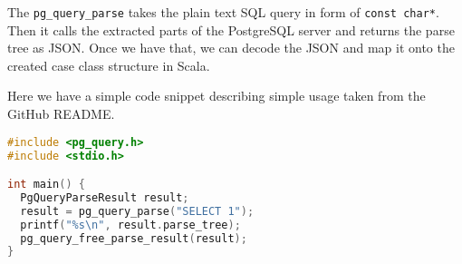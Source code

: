The \texttt{pg\_query\_parse} takes the plain text SQL query in form of \texttt{const char*}. Then it calls the extracted parts of the PostgreSQL server and returns the parse tree as JSON. Once we have that, we can decode the JSON and map it onto the created case class structure in Scala.

\newpage
Here we have a simple code snippet describing simple usage taken from the GitHub README\cite{libpgquery}. 

\begin{lstlisting}[language=C, basicstyle=\ttfamily, keywordstyle=\color{purple}]
#include <pg_query.h>
#include <stdio.h>

int main() {
  PgQueryParseResult result;
  result = pg_query_parse("SELECT 1");
  printf("%s\n", result.parse_tree);
  pg_query_free_parse_result(result);
}
\end{lstlisting}